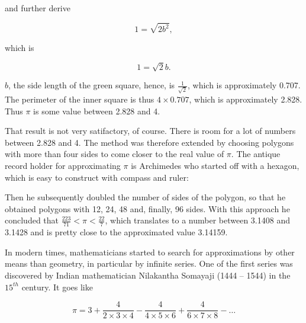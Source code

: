 \documentclass[tikz]{scrreprt}
\begin{document}
and further derive

\begin{equation}
1 = \sqrt{2b^2},
\end{equation}

which is

\begin{equation}
1 = \sqrt{2}b.
\end{equation}

$b$, the side length of the green square,
hence, is $\frac{1}{\sqrt{2}}$, which is
approximately 0.707. The perimeter of
the inner square is thus $4 \times 0.707$,
which is approximately 2.828.
Thus $\pi$ is some value between 2.828 and 4.

That result is not very satifactory, of course.
There is room for a lot of numbers between
2.828 and 4. The method was therefore extended
by choosing polygons with more than four sides
to come closer to the real value of $\pi$.
The antique record holder for approximating $\pi$
is Archimedes who started off with a hexagon,
which is easy to construct with compass and ruler:

\begin{center}
\end{center}

Then he subsequently doubled the number of sides
of the polygon, so that he obtained polygons with
12, 24, 48 and, finally, 96 sides. With this approach
he concluded that $\frac{223}{71} < \pi < \frac{22}{7}$,
which translates to a number between 3.1408 and 3.1428
and is pretty close to the approximated value 3.14159.

In modern times, mathematicians started to search
for approximations by other means than geometry,
in particular by infinite series. One of the first series
was discovered by Indian mathematician Nilakantha Somayaji
(1444 -- 1544) in the $15^{th}$ century. It goes like

\begin{equation}
  \pi = 3 + \frac{4}{2\times 3 \times 4} -
            \frac{4}{4\times 5 \times 6} +
            \frac{4}{6\times 7 \times 8} -
            \dots
\end{equation}
\end{document}
